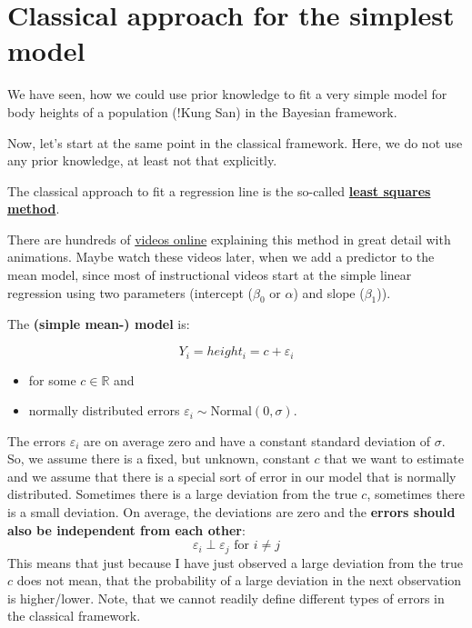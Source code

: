 \documentclass[
]{book}
\providecommand{\tightlist}{%
  \setlength{\itemsep}{0pt}\setlength{\parskip}{0pt}}
\begin{document}
\section{Classical approach for the simplest model}\label{classical_simple_mean_model}

We have seen, how we could use prior knowledge to fit a very simple model
for body heights of a population (!Kung San) in the Bayesian framework.

Now, let's start at the same point in the classical framework.
Here, we do not use any prior knowledge, at least not that explicitly.

The classical approach to fit a regression line is the so-called
\textbf{\href{https://en.wikipedia.org/wiki/Least_squares}{least squares method}}.

There are hundreds of \href{https://www.youtube.com/results?search_query=linear+regression}{videos online}
explaining this method in great detail
with animations. Maybe watch these videos later, when we add a predictor to the mean model,
since most of instructional videos start at the simple linear regression using
two parameters (intercept (\(\beta_0\) or \(\alpha\)) and slope (\(\beta_1\))).

The \textbf{(simple mean-) model} is:

\[ Y_i = height_i = c + \varepsilon_i \]

\begin{itemize}
\tightlist
\item
  for some \(c \in \mathbb{R}\) and
\item
  normally distributed errors \(\varepsilon_i \sim \text{Normal}(0, \sigma)\).
\end{itemize}

The errors \(\varepsilon_i\) are on average zero and have a constant standard deviation of \(\sigma\).
So, we assume there is a fixed, but unknown, constant \(c\) that we want to estimate and we
assume that there is a special sort of error in our model that is normally distributed.
Sometimes there is a large deviation from the true \(c\), sometimes there is a small deviation.
On average, the deviations are zero and the \textbf{errors should also be independent from each other}:
\[ \varepsilon_i \perp \varepsilon_j \text{ for } i \neq j\]
This means that just because I have just observed a large deviation from the true \(c\)
does not mean, that the probability of a large deviation in the next observation is higher/lower.
Note, that we cannot readily define different types of errors in the classical framework.
\end{document}
